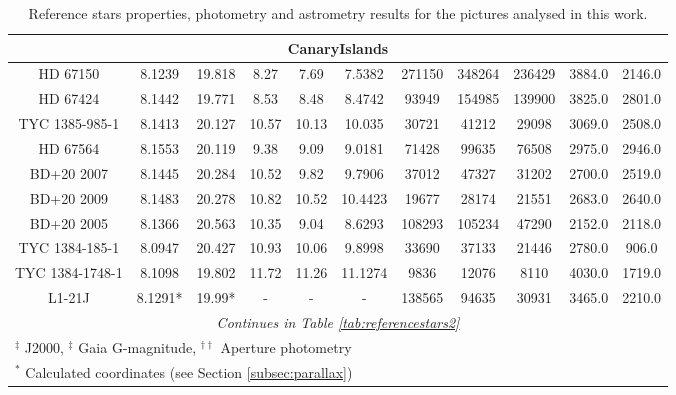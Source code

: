 \begin{table*}
{\begin{tabular}{c|cc|ccc|ccc|cc}
\hline
\multicolumn{11}{c}{CanaryIslands}\\
\hline
HD 67150 & 8.1239 & 19.818 & 8.27 & 7.69 & 7.5382 & 271150 & 348264 & 236429 & 3884.0 & 2146.0\\
HD 67424 & 8.1442 & 19.771 & 8.53 & 8.48 & 8.4742 & 93949 & 154985 & 139900 & 3825.0 & 2801.0\\
TYC 1385-985-1 & 8.1413 & 20.127 & 10.57 & 10.13 & 10.035 & 30721 & 41212 & 29098 & 3069.0 & 2508.0\\
HD 67564 & 8.1553 & 20.119 & 9.38 & 9.09 & 9.0181 & 71428 & 99635 & 76508 & 2975.0 & 2946.0\\
BD+20 2007 & 8.1445 & 20.284 & 10.52 & 9.82 & 9.7906 & 37012 & 47327 & 31202 & 2700.0 & 2519.0\\
BD+20 2009 & 8.1483 & 20.278 & 10.82 & 10.52 & 10.4423 & 19677 & 28174 & 21551 & 2683.0 & 2640.0\\
BD+20 2005 & 8.1366 & 20.563 & 10.35 & 9.04 & 8.6293 & 108293 & 105234 & 47290 & 2152.0 & 2118.0\\
TYC 1384-185-1 & 8.0947 & 20.427 & 10.93 & 10.06 & 9.8998 & 33690 & 37133 & 21446 & 2780.0 & 906.0\\
TYC 1384-1748-1 & 8.1098 & 19.802 & 11.72 & 11.26 & 11.1274 & 9836 & 12076 & 8110 & 4030.0 & 1719.0\\
L1-21J & 8.1291* & 19.99* & - & - & - & 138565 & 94635 & 30931 & 3465.0 & 2210.0\\

\hline
\multicolumn{11}{c}{\it Continues in Table \ref{tab:referencestars2}}\\
\hline\hline
\multicolumn{11}{l}{\footnotesize $^\ddagger$ J2000, $^\ddagger$ Gaia G-magnitude, $^{\dagger\dagger}$ Aperture photometry}\\
\multicolumn{11}{l}{\footnotesize $^*$ Calculated coordinates (see Section \ref{subsec:parallax})}\\
\end{tabular}}
\caption{Reference stars properties, photometry and astrometry results for the pictures analysed in this work.\label{tab:referencestars1}}
\end{table*}
